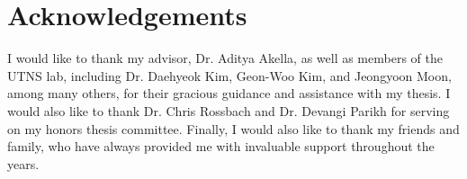 \section{Acknowledgements}
I would like to thank my advisor, Dr. Aditya Akella, as well as members of the UTNS lab, including Dr. Daehyeok Kim, Geon-Woo Kim, and Jeongyoon Moon, among many others, for their gracious guidance and assistance with my thesis. I would also like to thank Dr. Chris Rossbach and Dr. Devangi Parikh for serving on my honors thesis committee. Finally, I would also like to thank my friends and family, who have always provided me with invaluable support throughout the years. 